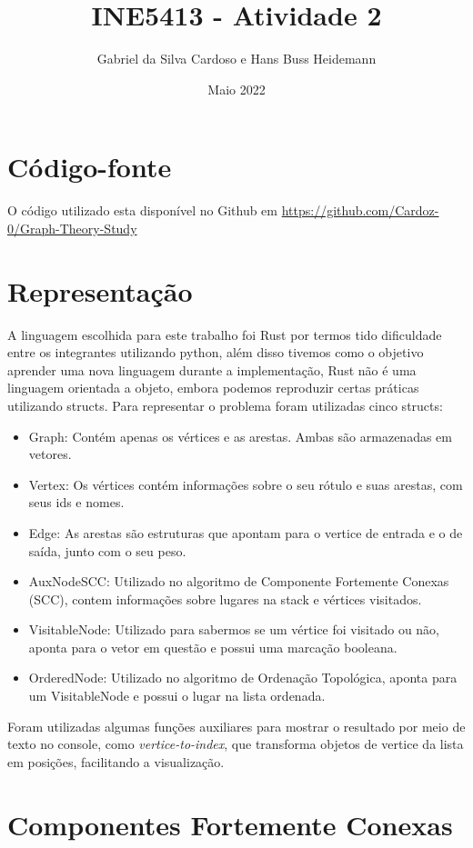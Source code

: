 \documentclass{article}
\title{INE5413 - Atividade 2}
\author{Gabriel da Silva Cardoso e Hans Buss Heidemann}
\date{Maio 2022}
\begin{document}
\maketitle

\section{Código-fonte}

O código utilizado esta disponível no Github em  \url{https://github.com/Cardoz-0/Graph-Theory-Study}


\section{Representação}
A linguagem escolhida para este trabalho foi Rust por termos tido dificuldade entre os integrantes utilizando python, além disso tivemos como o objetivo aprender uma nova linguagem durante a implementação, Rust não é uma linguagem orientada a objeto, embora podemos reproduzir certas práticas utilizando structs. Para representar o problema foram utilizadas cinco structs:

\begin{itemize}
    \item Graph: Contém apenas os vértices e as arestas. Ambas são armazenadas em  vetores.
    \item Vertex: Os vértices contém informações sobre o seu rótulo e suas arestas, com seus ids e nomes. 
    \item Edge: As arestas são estruturas que apontam para o vertice de entrada e o de saída, junto com o seu peso.
    \item AuxNodeSCC: Utilizado no algoritmo de Componente Fortemente Conexas (SCC), contem informações sobre lugares na stack e vértices visitados.
    \item VisitableNode: Utilizado para sabermos se um vértice foi visitado ou não, aponta para o vetor em questão e possui uma marcação booleana.
    \item OrderedNode: Utilizado no algoritmo de Ordenação Topológica, aponta para um VisitableNode e possui o lugar na lista ordenada.
\end{itemize}

Foram utilizadas algumas funções auxiliares para mostrar o resultado por meio de texto no console, como \textit{vertice-to-index}, que transforma objetos de vertice da lista em posições, facilitando a visualização.

\section{Componentes Fortemente Conexas}
\end{document}
